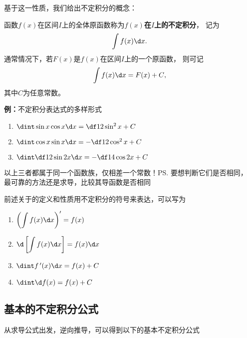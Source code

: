 基于这一性质，我们给出不定积分的概念：

\begin{thx}
	函数$f(x)$在区间$I$上的全体原函数称为{\bf $f(x)$在$I$上的不定积分}，
	记为
	$$\int f(x)\d x.$$
	通常情况下，若$F(x)$是$f(x)$在区间$I$上的一个原函数， 则可记
	$${\int f(x)\d x=F(x)+C},$$
	其中$C$为任意常数。
\end{thx}

{\bf 例：}不定积分表达式的多样形式
\begin{enumerate}[(1)]
  \setlength{\itemindent}{1cm}
  \item $\dint\sin x\cos x\d x=\df12\sin^2x+C$
  \item $\dint\cos x\sin x\d x=-\df12\cos^2x+C$
  \item $\dint\df12\sin2x\d x=-\df14\cos2x+C$
\end{enumerate}
以上三者都属于同一个函数族，仅相差一个常数！\ps{要想判断它们是否相同，
最可靠的方法还是求导，比较其导函数是否相同}

前述关于的定义和性质用不定积分的符号来表达，可以写为

\begin{thx}
	\begin{enumerate}[(1)]
	  \item $\left(\displaystyle\int f(x)\d x\right)'=f(x)$ 
	  \item $\d\left[\displaystyle\int f(x)\d x\right]=f(x)\d x$ 
	  \item $\dint f\,'(x)\d x =f(x)+C$
	  \item $\dint \d f(x)=f(x)+C$
	\end{enumerate}
\end{thx}

\subsection{基本的不定积分公式}

从求导公式出发，逆向推导，可以得到以下的基本不定积分公式

